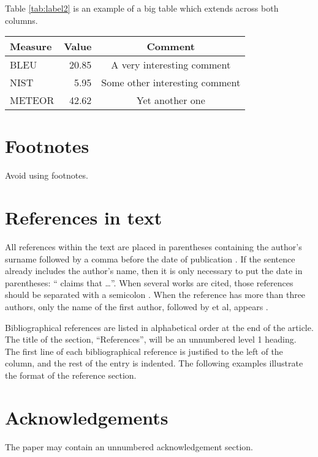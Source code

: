 \documentclass[10pt, a4paper]{article}
\begin{document}
Table \ref{tab:label2} is an example of a big table which extends across both columns.

 \begin{table*}
 \centering
 \begin{tabular}{l r c}
   \hline
   Measure & Value & Comment \\ \hline
   BLEU &  20.85 & A very interesting comment \\ 
   NIST &  5.95 & Some other interesting comment \\ 
   METEOR & 42.62 & Yet another one \\ 
   \hline
 \end{tabular}
 \caption{The caption of the big table}
 \label{tab:label2}
\end{table*}

\section{Footnotes}

Avoid using footnotes.


\section{References in text}

All references within the text are placed in parentheses containing the author's surname followed by a comma before the date of publication \cite{w-87}. If the sentence already includes the author's name, then it is only necessary to put the date in parentheses: `` claims that \ldots''. When several works are cited, those references should be separated with a semicolon \cite{w-87,ap-08,s-08}. When the reference has more than three authors, only the name of the first author, followed by et al, appears \cite{m+-08}.

Bibliographical references are listed in alphabetical order at the end of the article. The title of the section, ``References'', will be an unnumbered level 1 heading. The first line of each bibliographical reference is justified to the left of the column, and the rest of the entry is indented. The following examples illustrate the format of the reference section.


\section*{Acknowledgements}

The paper may contain an unnumbered acknowledgement section.
\end{document}
